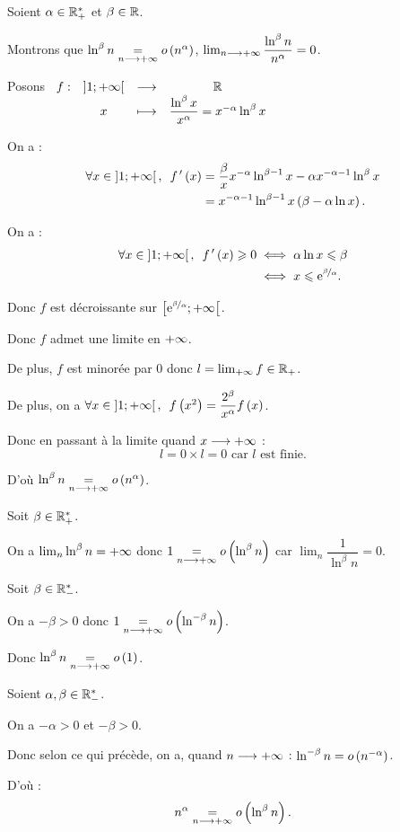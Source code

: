 \begin{dem}
Soient \(\alpha\in\mathbb{R}_+^*\) et \(\beta\in\mathbb{R}\).

Montrons que \(\ln^\beta n\underset{n\longrightarrow+\infty}{=}o\left(n^\alpha\right)\), \cad \(\lim_{n\longrightarrow+\infty}\dfrac{\ln^\beta n}{n^\alpha}=0\).

Posons \(\begin{array}[t]{cccc}f : & \left]1;+\infty\right[ & \longrightarrow & \mathbb{R} \\ & x & \longmapsto & \dfrac{\ln^\beta x}{x^\alpha}=x^{-\alpha}\ln^\beta x\end{array}\)

On a : \[\begin{aligned}
\quantifs{\forall x\in\intervee{1}{\pinf}}f\prim\paren{x}&=\dfrac{\beta}{x}x^{-\alpha}\ln^{\beta-1}x-\alpha x^{-\alpha-1}\ln^\beta x \\
&=x^{-\alpha-1}\ln^{\beta-1}x\paren{\beta-\alpha\ln x}.
\end{aligned}\]

On a : \[\begin{aligned}
\quantifs{\forall x\in\intervee{1}{\pinf}}f\prim\paren{x}\geq0&\ssi\alpha\ln x\leq\beta \\
&\ssi x\leq\e{\nicefrac{\beta}{\alpha}}.
\end{aligned}\]

Donc \(f\) est décroissante sur \(\left[\mathrm{e}^{\nicefrac{\beta}{\alpha}};+\infty\right[\).

Donc \(f\) admet une limite en \(+\infty\).

De plus, \(f\) est minorée par \(0\) donc \(l=\lim_{+\infty}f\in\mathbb{R}_+\).

De plus, on a \(\quantifs{\forall x\in\intervee{1}{\pinf}}f\paren{x^2}=\dfrac{2^\beta}{x^\alpha}f\paren{x}\).

Donc en passant à la limite quand \(x\longrightarrow+\infty\) : \[l=0\times l=0\text{ car }l\text{ est finie}.\]

D'où \(\ln^\beta n\underset{n\longrightarrow+\infty}{=}o\left(n^{\alpha}\right)\).
\end{dem}

\begin{dem}
Soit \(\beta\in\mathbb{R}_+^*\).

On a \(\lim_n\ln^\beta n=+\infty\) donc \(1\underset{n\longrightarrow+\infty}{=}o\left(\ln^\beta n\right)\) car \(\lim_n\dfrac{1}{\ln^\beta n}=0\).
\end{dem}

\begin{dem}
Soit \(\beta\in\mathbb{R}_-^*\).

On a \(-\beta>0\) donc \(1\underset{n\longrightarrow+\infty}{=}o\left(\ln^{-\beta}n\right)\).

Donc \(\ln^\beta n\underset{n\longrightarrow+\infty}{=}o\left(1\right)\).
\end{dem}

\begin{dem}
Soient \(\alpha,\beta\in\mathbb{R}_-^*\).

On a \(-\alpha>0\) et \(-\beta>0\).

Donc selon ce qui précède, on a, quand \(n\longrightarrow+\infty\) : \(\ln^{-\beta}n=o\left(n^{-\alpha}\right)\).

D'où : \[n^\alpha\underset{n\longrightarrow+\infty}{=}o\left(\ln^\beta n\right).\]
\end{dem}

